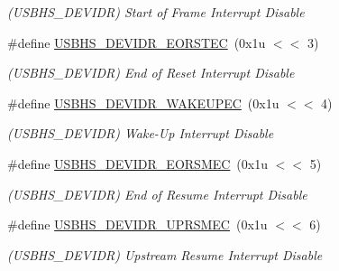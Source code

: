 \begin{DoxyCompactItemize}
\begin{DoxyCompactList}\small\item\em (U\+S\+B\+H\+S\+\_\+\+D\+E\+V\+I\+DR) Start of Frame Interrupt Disable \end{DoxyCompactList}\item 
\mbox{\label{group__SAME70__USBHS_gac38f7ffa38403f8160b392490c620a18}} 
\#define \mbox{\hyperlink{group__SAME70__USBHS_gac38f7ffa38403f8160b392490c620a18}{U\+S\+B\+H\+S\+\_\+\+D\+E\+V\+I\+D\+R\+\_\+\+E\+O\+R\+S\+T\+EC}}~(0x1u $<$$<$ 3)
\begin{DoxyCompactList}\small\item\em (U\+S\+B\+H\+S\+\_\+\+D\+E\+V\+I\+DR) End of Reset Interrupt Disable \end{DoxyCompactList}\item 
\mbox{\label{group__SAME70__USBHS_ga58b300fb668b6a6c4caf00cd36a0dbc8}} 
\#define \mbox{\hyperlink{group__SAME70__USBHS_ga58b300fb668b6a6c4caf00cd36a0dbc8}{U\+S\+B\+H\+S\+\_\+\+D\+E\+V\+I\+D\+R\+\_\+\+W\+A\+K\+E\+U\+P\+EC}}~(0x1u $<$$<$ 4)
\begin{DoxyCompactList}\small\item\em (U\+S\+B\+H\+S\+\_\+\+D\+E\+V\+I\+DR) Wake-\/\+Up Interrupt Disable \end{DoxyCompactList}\item 
\mbox{\label{group__SAME70__USBHS_ga70444ef92493dfca180499e8510b2fc7}} 
\#define \mbox{\hyperlink{group__SAME70__USBHS_ga70444ef92493dfca180499e8510b2fc7}{U\+S\+B\+H\+S\+\_\+\+D\+E\+V\+I\+D\+R\+\_\+\+E\+O\+R\+S\+M\+EC}}~(0x1u $<$$<$ 5)
\begin{DoxyCompactList}\small\item\em (U\+S\+B\+H\+S\+\_\+\+D\+E\+V\+I\+DR) End of Resume Interrupt Disable \end{DoxyCompactList}\item 
\mbox{\label{group__SAME70__USBHS_ga09aec79ff3dfda039ef5686ca7d1eaa3}} 
\#define \mbox{\hyperlink{group__SAME70__USBHS_ga09aec79ff3dfda039ef5686ca7d1eaa3}{U\+S\+B\+H\+S\+\_\+\+D\+E\+V\+I\+D\+R\+\_\+\+U\+P\+R\+S\+M\+EC}}~(0x1u $<$$<$ 6)
\begin{DoxyCompactList}\small\item\em (U\+S\+B\+H\+S\+\_\+\+D\+E\+V\+I\+DR) Upstream Resume Interrupt Disable \end{DoxyCompactList}\item 

\end{DoxyCompactItemize}

